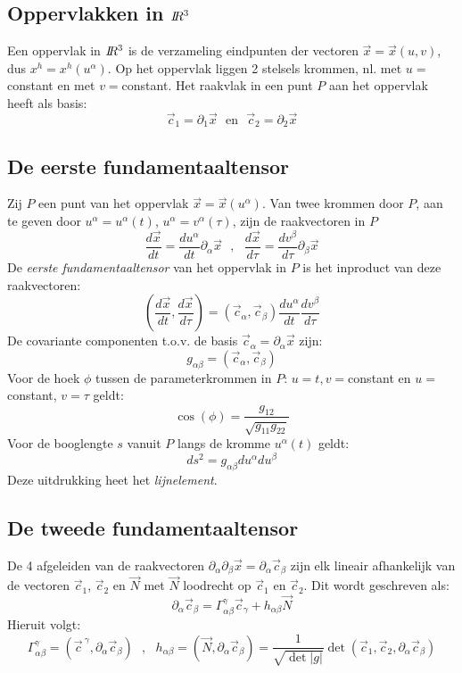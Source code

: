 \subsection{Oppervlakken in $I\hspace{-1mm}R^3$}
Een oppervlak in $I\hspace{-1mm}R^3$ is de verzameling eindpunten der vectoren $\vec{x}=\vec{x}(u,v)$,
dus $x^h=x^h(u^\alpha)$. Op het oppervlak liggen 2 stelsels krommen, nl. met
$u=$constant en met $v=$constant.
\npar
Het raakvlak in een punt $P$ aan het oppervlak heeft als basis:
\[
\vec{c}_1=\partial_1\vec{x}~~~\mbox{en}~~~\vec{c}_2=\partial_2\vec{x}
\]

\subsection{De eerste fundamentaaltensor}
Zij $P$ een punt van het oppervlak $\vec{x}=\vec{x}(u^\alpha)$. Van twee krommen
door $P$, aan te geven door $u^\alpha=u^\alpha(t)$, $u^\alpha=v^\alpha(\tau)$,
zijn de raakvectoren in $P$
\[
\frac{d\vec{x}}{dt}=\frac{du^\alpha}{dt}\partial_\alpha\vec{x}~~~,~~~
\frac{d\vec{x}}{d\tau}=\frac{dv^\beta}{d\tau}\partial_\beta\vec{x}
\]
De {\it eerste fundamentaaltensor} van het oppervlak in $P$ is het inproduct
van deze raakvectoren:
\[
\left(\frac{d\vec{x}}{dt},\frac{d\vec{x}}{d\tau}\right)=
(\vec{c}_\alpha,\vec{c}_\beta)\frac{du^\alpha}{dt}\frac{dv^\beta}{d\tau}
\]
De covariante componenten t.o.v. de basis $\vec{c}_\alpha=\partial_\alpha\vec{x}$
zijn:
\[
g_{\alpha\beta}=(\vec{c}_\alpha,\vec{c}_\beta)
\]
Voor de hoek $\phi$ tussen de parameterkrommen in $P$: $u=t,v=$constant en
$u=$constant, $v=\tau$ geldt:
\[
\cos(\phi)=\frac{g_{12}}{\sqrt{g_{11}g_{22}}}
\]
Voor de booglengte $s$ vanuit $P$ langs de kromme $u^\alpha(t)$ geldt:
\[
ds^2=g_{\alpha\beta}du^\alpha du^\beta
\]
Deze uitdrukking heet het {\it lijnelement}.

\subsection{De tweede fundamentaaltensor}
De 4 afgeleiden van de raakvectoren $\partial_\alpha\partial_\beta\vec{x}=\partial_\alpha\vec{c}_\beta$
zijn elk lineair afhankelijk van de vectoren $\vec{c}_1$, $\vec{c}_2$ en $\vec{N}$
met $\vec{N}$ loodrecht op $\vec{c}_1$ en $\vec{c}_2$. Dit wordt geschreven als:
\[
\partial_\alpha\vec{c}_\beta=\Gamma^\gamma_{\alpha\beta}\vec{c}_\gamma+h_{\alpha\beta}\vec{N}
\]
Hieruit volgt:
\[
\Gamma^\gamma_{\alpha\beta}=(\vec{c}^{~\gamma},\partial_\alpha\vec{c}_\beta)~~~,~~~
h_{\alpha\beta}=(\vec{N},\partial_\alpha\vec{c}_\beta)=\frac{1}{\sqrt{\det|g|}}\det(\vec{c}_1,\vec{c}_2,\partial_\alpha\vec{c}_\beta)
\]

